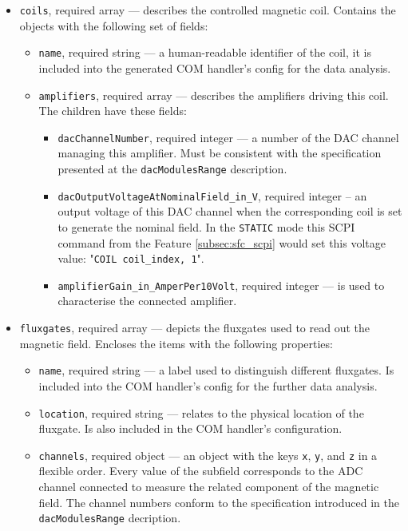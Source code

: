\begin{itemize}
	\item{
		\texttt{coils}, required array --- describes the controlled magnetic coil. Contains the objects with the following set of fields:
		\begin{itemize}
			\item \texttt{name}, required string --- a human-readable identifier of the coil, it is included into the generated COM handler's config for the data analysis.
			\item{
				\texttt{amplifiers}, required array --- describes the amplifiers driving this coil. The children have these fields:
				\begin{itemize}
					\item \texttt{dacChannelNumber}, required integer --- a number of the DAC channel managing this amplifier. Must be consistent with the specification presented at the \texttt{dacModulesRange} description.
					\item \texttt{dacOutputVoltageAtNominalField\_in\_V}, required integer -- an output voltage of this DAC channel when the corresponding coil is set to generate the nominal field. In the \texttt{STATIC} mode this SCPI command from the Feature \ref{subsec:sfc_scpi} would set this voltage value: "\texttt{COIL coil\_index, 1}".
					\item \texttt{amplifierGain\_in\_AmperPer10Volt}, required integer --- is used to characterise the connected amplifier.
				\end{itemize}
			}
		\end{itemize}
	}
	\item{
		\texttt{fluxgates}, required array --- depicts the fluxgates used to read out the magnetic field. Encloses the items with the following properties:
		\begin{itemize}
			\item \texttt{name}, required string --- a label used to distinguish different fluxgates. Is included into the COM handler's config for the further data analysis.
			\item \texttt{location}, required string --- relates to the physical location of the fluxgate. Is also included in the COM handler's configuration.
			\item \texttt{channels}, required object --- an object with the keys \texttt{x}, \texttt{y}, and \texttt{z} in a flexible order. Every value of the subfield corresponds to the ADC channel connected to measure the related component of the magnetic field. The channel numbers conform to the specification introduced in the \texttt{dacModulesRange} decription.
		\end{itemize}
	}
\end{itemize}

